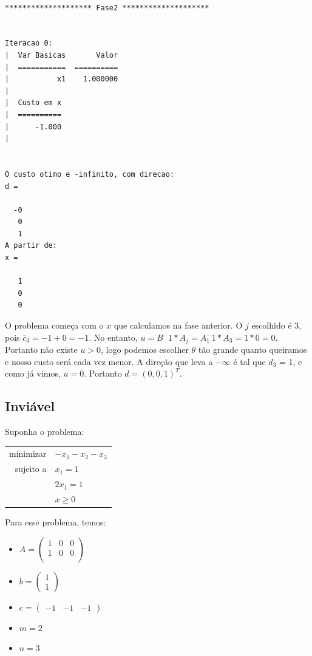 \documentclass[12pt]{article}
\begin{document}
	\lstset {firstnumber=29}
	\begin{lstlisting}[style=term]

******************** Fase2 ********************


Iteracao 0:
|  Var Basicas       Valor
|  ===========  ==========
|           x1    1.000000
|  
|  Custo em x
|  ==========
|      -1.000
|  


O custo otimo e -infinito, com direcao:
d =

  -0
   0
   1
A partir de:
x = 

   1
   0
   0

	\end{lstlisting}
	O problema começa com o $x$ que calculamos na fase anterior. O $j$ escolhido é 3, pois $\overline{c}_3 = -1 + 0 = -1$. No entanto, $u = B^-1 * A_j = A_1^-1 * A_3 = 1 * 0 = 0$. Portanto não existe $u > 0$, logo podemos escolher $\theta$ tão grande quanto queiramos e nosso custo será cada vez menor. A direção que leva a $-\infty$ é tal que $d_3$ = 1, e como já vimos, $u = 0$. Portanto $d = (0, 0, 1)^T$.
	
	\subsection{Inviável}
	Suponha o problema:
	\begin{center}	
    	\begin{tabular}{r l}
	  		minimizar & $-x_1 - x_2 - x_3$ \\
        
        	sujeito a & $x_1 = 1$ \\
        	& $2x_1 = 1$ \\
            & $x \geq 0$ \\
        \end{tabular}
    \end{center}
    
        Para esse problema, temos: 
	   
	\begin{itemize}
	\item $A = \begin{pmatrix}
    1 & 0 & 0 \\
    1 & 0 & 0 \\    
    \end{pmatrix}$
    
	\item $b = \begin{pmatrix}
    1 \\
    1
    \end{pmatrix} $
    
    \item $c = \begin{pmatrix}
    -1 & -1 & -1 
    \end{pmatrix}$
    
    \item $m = 2$
    
    \item $n = 3$
	\end{itemize}
\end{document}
